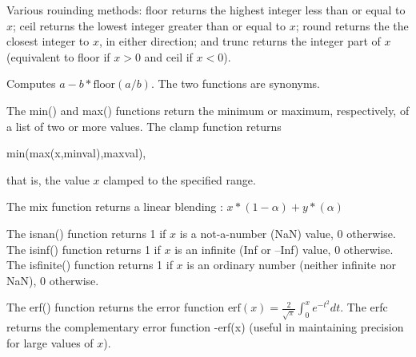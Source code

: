 \documentclass[11pt,letterpaper]{book}
\begin{document}
Various rouinding methods: {\cf floor} returns the highest integer less
than or equal to $x$; {\cf ceil} returns the lowest integer greater than
or equal to $x$; {\cf round} returns the the closest integer to $x$, in
either direction; and {\cf trunc} returns the integer part of $x$
(equivalent to {\cf floor} if $x>0$ and {\cf ceil} if $x<0$).
\apiend

Computes $a - b*\mbox{floor}(a/b)$.  The two functions are synonyms.
\apiend

  
The {\cf min()} and {\cf max()} functions return the minimum or maximum,
respectively, of a list of two or more values.  The {\cf clamp}
function returns

\hspace{2em} {\cf min(max(x,minval),maxval)},

\noindent that is, the value $x$ clamped to the specified range.
\apiend

The {\cf mix} function returns a linear blending :
$ x*(1-\alpha) + y*(\alpha) $
\apiend

  
The {\cf isnan()} function returns 1 if $x$ is a not-a-number (NaN)
value, 0 otherwise.  The {\cf isinf()} function returns 1 if $x$ is an
infinite (Inf or --Inf) value, 0 otherwise.  The {\cf isfinite()}
function returns 1 if $x$ is an ordinary number (neither infinite nor
NaN), 0 otherwise.  \apiend

 
The {\cf erf()} function returns the error function 
${\mathrm{erf}(x) = \frac{2}{\sqrt{\pi}} \int_0^x e^{-t^2}} dt$.
The {\cf erfc} returns the complementary error function {-erf(x)}
(useful in maintaining precision for large values of $x$).
\apiend
\end{document}
